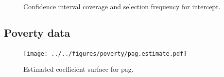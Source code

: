 \documentclass[authoryear, review, 11pt]{elsarticle}
\begin{document}
			
			\begin{figure}
				\begin{center}
					\caption{Confidence interval coverage and selection frequency for intercept.\label{figIntercept}}
				\end{center}
			\end{figure}
			
			
			
			
			
		\subsection{Poverty data}
			\begin{figure}
				\begin{center}
					\texttt{[image: ../../figures/poverty/pag.estimate.pdf]}
					\caption{Estimated coefficient surface for pag.\label{fig:pag}}
				\end{center}
			\end{figure}
					
\end{document}
